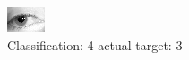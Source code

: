\begin{figure}[h!]
\begin{center}
\includegraphics[width=0.60\columnwidth]{figures/ID1346_class_4_target_3.png}
\end{center}
\caption{ Classification: 4 actual target: 3}
\label{fig:ID1346_class_4_target_3}
\end{figure}
